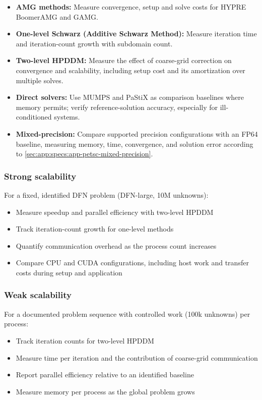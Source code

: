 \begin{itemize}
\item \textbf{AMG methods:} Measure convergence, setup and solve costs for HYPRE BoomerAMG and GAMG.

\item \textbf{One-level Schwarz (Additive Schwarz Method):} Measure iteration time and iteration-count growth with subdomain count.

\item \textbf{Two-level HPDDM:} Measure the effect of coarse-grid correction on convergence and scalability, including setup cost and its amortization over multiple solves.

\item \textbf{Direct solvers:} Use MUMPS and PaStiX as comparison baselines where memory permits; verify reference-solution accuracy, especially for ill-conditioned systems.

\item \textbf{Mixed-precision:} Compare supported precision configurations with an FP64 baseline, measuring memory, time, convergence, and solution error according to \cref{sec:app:specs:app-petsc-mixed-precision}.
\end{itemize}

\subsubsection{Strong scalability}

For a fixed, identified DFN problem (DFN-large, 10M unknowns):
\begin{itemize}
\item Measure speedup and parallel efficiency with two-level HPDDM
\item Track iteration-count growth for one-level methods
\item Quantify communication overhead as the process count increases
\item Compare CPU and CUDA configurations, including host work and transfer costs during setup and application
\end{itemize}

\subsubsection{Weak scalability}

For a documented problem sequence with controlled work (100k unknowns) per process:
\begin{itemize}
\item Track iteration counts for two-level HPDDM
\item Measure time per iteration and the contribution of coarse-grid communication
\item Report parallel efficiency relative to an identified baseline
\item Measure memory per process as the global problem grows
\end{itemize}

